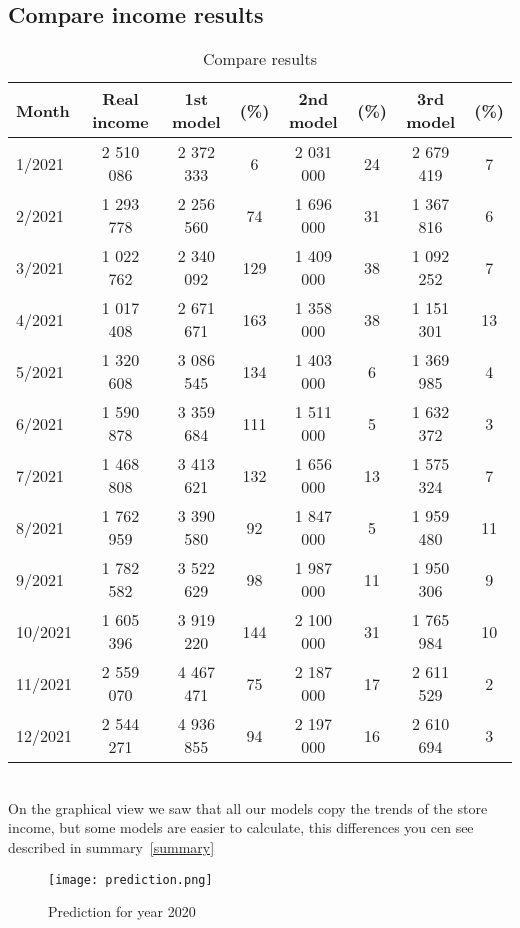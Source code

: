 \subsection{Compare income results}
\begin{table}[h!]
    \begin{center}
        \begin{tabular}{ | l | c | c | c | c | c | c | c |}
            \hline
            {\textbf{Month}} & \textbf{Real income} & \textbf{1st model} & \textbf{(\%)}  & \textbf{2nd model} & \textbf{(\%)} & \textbf{3rd model} & \textbf{(\%)}\\
            \hline
            1/2021 & 2 510 086 & 2 372 333 & 6 & 2 031 000 & 24 & 2 679 419 & 7\\
            2/2021 & 1 293 778 & 2 256 560 & 74 & 1 696 000 & 31 & 1 367 816 & 6\\
            3/2021 & 1 022 762 & 2 340 092 & 129 & 1 409 000 & 38 & 1 092 252 & 7\\
            4/2021 & 1 017 408 & 2 671 671 & 163 & 1 358 000 & 38 & 1 151 301 & 13\\
            5/2021 & 1 320 608 & 3 086 545 & 134 & 1 403 000 & 6 & 1 369 985 & 4\\
            6/2021 & 1 590 878 & 3 359 684 & 111 & 1 511 000 & 5 & 1 632 372 & 3\\
            7/2021 & 1 468 808 & 3 413 621 & 132 & 1 656 000 & 13 & 1 575 324 & 7\\
            8/2021 & 1 762 959 & 3 390 580 & 92 & 1 847 000 & 5 & 1 959 480 & 11\\
            9/2021 & 1 782 582 & 3 522 629 & 98 & 1 987 000 & 11 & 1 950 306 & 9\\
            10/2021 & 1 605 396 & 3 919 220 & 144 & 2 100 000 & 31 & 1 765 984 & 10\\
            11/2021 & 2 559 070 & 4 467 471 & 75 & 2 187 000 & 17 & 2 611 529 & 2\\
            12/2021 & 2 544 271 & 4 936 855 & 94 & 2 197 000 & 16 & 2 610 694 & 3\\
            \hline
        \end{tabular}
    \end{center}
    \caption{Compare results}
    \label{Compare results}
\end{table}\\
On the graphical view we saw that all our models copy the trends of the store income, but some models are easier to calculate, this differences you cen see described in summary~\ref{summary}
\begin{figure}[h!]
    \begin{center}
        \texttt{[image: prediction.png]}
    \end{center}
    \caption{Prediction for year 2020}
    \label{prediction}
\end{figure}\\
\newpage
